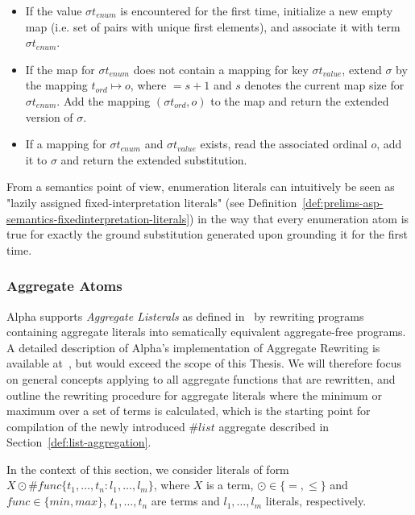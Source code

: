 \begin{itemize}
    \item If the value $\sigma t_{enum}$ is encountered for the first time, initialize a new empty map (i.e. set of pairs with unique first elements), and associate it with  term $\sigma t_{enum}$.
    \item If the map for $\sigma t_{enum}$ does not contain a mapping for key $\sigma t_{value}$, extend $\sigma$ by the mapping $t_{ord} \mapsto o$, where $ = s + 1$ and $s$ denotes the current map size for $\sigma t_{enum}$. Add the mapping $(\sigma t_{ord}, o)$ to the map and return the extended version of $\sigma$.
    \item If a mapping for $\sigma t_{enum}$ and $\sigma t_{value}$ exists, read the associated ordinal $o$, add it to $\sigma$ and return the extended substitution.
\end{itemize}    
From a semantics point of view, enumeration literals can intuitively be seen as "lazily assigned fixed-interpretation literals"  (see Definition~\ref{def:prelims-asp-semantics-fixedinterpretation-literals}) in the way that every enumeration atom is true for exactly the ground substitution generated upon grounding it for the first time.

\subsubsection{Aggregate Atoms}
\label{subsubsec:alpha-arch-aggregate-rewriting}

Alpha supports \emph{Aggregate Listerals} as defined in~\cite[p.~3]{asp-core2} by rewriting programs containing aggregate literals into sematically equivalent aggregate-free programs. A detailed description of Alpha's implementation of Aggregate Rewriting is available at~\cite{alpha-aggregate-support}, but would exceed the scope of this Thesis. We will therefore focus on general concepts applying to all aggregate functions that are rewritten, and outline the rewriting procedure for aggregate literals where the minimum or maximum over a set of terms is calculated, which is the starting point for compilation of the newly introduced $\#list$ aggregate described in Section~\ref{def:list-aggregation}.

In the context of this section, we consider literals of form $X \odot \#\mathit{func}\{t_1,\ldots,t_n : l_1,\ldots,l_m\}$, where $X$ is a term, $\odot \in \{=,\leq\}$ and $\mathit{func} \in \{\mathit{min},\mathit{max}\}$, $t_1,\ldots,t_n$ are terms and $l_1,\ldots,l_m$ literals, respectively.

